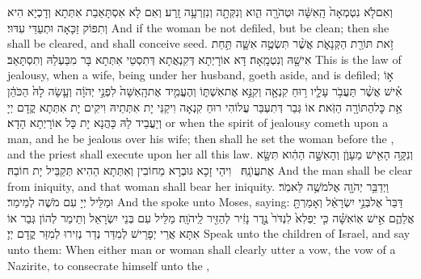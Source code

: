 {וְאִם\maqqaf לֹ֤א נִטְמְאָה֙ הָֽאִשָּׁ֔ה וּטְהֹרָ֖ה הִ֑וא וְנִקְּתָ֖ה וְנִזְרְעָ֥ה זָֽרַע׃}
{וְאִם לָא אִסְתָּאַבַת אִתְּתָא וְדָכְיָא הִיא וְתִפּוֹק זַכָּאָה וּתְעַדֵּי עִדּוּי׃}
{And if the woman be not defiled, but be clean; then she shall be cleared, and shall conceive seed.}{}
{זֹ֥את תּוֹרַ֖ת הַקְּנָאֹ֑ת אֲשֶׁ֨ר תִּשְׂטֶ֥ה אִשָּׁ֛ה תַּ֥חַת אִישָׁ֖הּ וְנִטְמָֽאָה׃}
{דָּא אוֹרָיְתָא דְּקִנְאֲתָא דְּתִסְטֵי אִתְּתָא בָּר מִבַּעְלַהּ וְתִסְתָּאַב׃}
{This is the law of jealousy, when a wife, being under her husband, goeth aside, and is defiled;}{}
{א֣וֹ אִ֗ישׁ אֲשֶׁ֨ר תַּעֲבֹ֥ר עָלָ֛יו ר֥וּחַ קִנְאָ֖ה וְקִנֵּ֣א אֶת\maqqaf אִשְׁתּ֑וֹ וְהֶעֱמִ֤יד אֶת\maqqaf הָֽאִשָּׁה֙ לִפְנֵ֣י יְהֹוָ֔ה וְעָ֤שָׂה לָהּ֙ הַכֹּהֵ֔ן אֵ֥ת כׇּל\maqqaf הַתּוֹרָ֖ה הַזֹּֽאת׃}
{אוֹ גְּבַר דְּתִעְבַּר עֲלוֹהִי רוּחַ קִנְאָה וִיקַנֵּי יָת אִתְּתֵיהּ וִיקִים יָת אִתְּתָא קֳדָם יְיָ וְיַעֲבֵיד לַהּ כָּהֲנָא יָת כָּל אוֹרָיְתָא הָדָא׃}
{or when the spirit of jealousy cometh upon a man, and he be jealous over his wife; then shall he set the woman before the \lord, and the priest shall execute upon her all this law.}{}
{וְנִקָּ֥ה הָאִ֖ישׁ מֵעָוֺ֑ן וְהָאִשָּׁ֣ה הַהִ֔וא תִּשָּׂ֖א אֶת\maqqaf עֲוֺנָֽהּ׃ \petucha }
{וִיהֵי זָכָא גּוּבְרָא מֵחוֹבִין וְאִתְּתָא הַהִיא תְּקַבֵּיל יָת חוֹבַהּ׃}
{And the man shall be clear from iniquity, and that woman shall bear her iniquity.}{}
\newperek
{}%
{וַיְדַבֵּ֥ר יְהֹוָ֖ה אֶל\maqqaf מֹשֶׁ֥ה לֵּאמֹֽר׃}
{וּמַלֵּיל יְיָ עִם מֹשֶׁה לְמֵימַר׃}
{And the \lord\space spoke unto Moses, saying:}{}
{דַּבֵּר֙ אֶל\maqqaf בְּנֵ֣י יִשְׂרָאֵ֔ל וְאָמַרְתָּ֖ אֲלֵהֶ֑ם אִ֣ישׁ אֽוֹ\maqqaf אִשָּׁ֗ה כִּ֤י יַפְלִא֙ לִנְדֹּר֙ נֶ֣דֶר נָזִ֔יר לְהַזִּ֖יר לַֽיהֹוָֽה׃}
{מַלֵּיל עִם בְּנֵי יִשְׂרָאֵל וְתֵימַר לְהוֹן גְּבַר אוֹ אִתָּא אֲרֵי יְפָרֵישׁ לְמִדַּר נְדַר נְזִירוּ לְמִזַּר קֳדָם יְיָ׃}
{Speak unto the children of Israel, and say unto them: When either man or woman shall clearly utter a vow, the vow of a Nazirite, to consecrate himself unto the \lord,}{}
